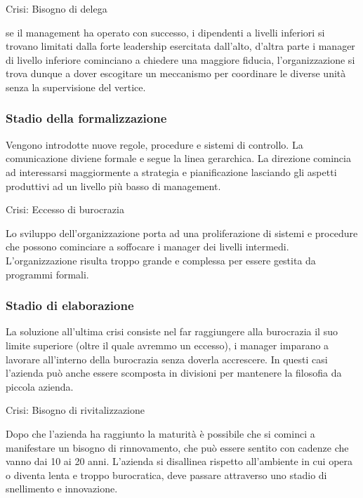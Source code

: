 \documentclass[14pt]{extarticle}
\begin{document}
\begin{center}
    \textcolor{red!50}{Crisi: Bisogno di delega}

    se il management ha operato con successo, i dipendenti a livelli inferiori
    si trovano limitati dalla forte leadership esercitata dall'alto, d'altra
    parte i manager di livello inferiore cominciano a chiedere una maggiore
    fiducia, l'organizzazione si trova dunque a dover escogitare un meccanismo
    per coordinare le diverse unità senza la supervisione del vertice.
\end{center}

\subsubsection{Stadio della formalizzazione}

Vengono introdotte nuove regole, procedure e sistemi di controllo. La
comunicazione diviene formale e segue la linea gerarchica. La direzione comincia
ad interessarsi maggiormente a strategia e pianificazione lasciando gli aspetti
produttivi ad un livello più basso di management.

\begin{center}
    \textcolor{red!50}{Crisi: Eccesso di burocrazia}

    Lo sviluppo dell'organizzazione porta ad una proliferazione di sistemi e
    procedure che possono cominciare a soffocare i manager dei livelli
    intermedi. L'organizzazione risulta troppo grande e complessa per essere
    gestita da programmi formali.
\end{center}

\subsubsection{Stadio di elaborazione}

La soluzione all'ultima crisi consiste nel far raggiungere alla burocrazia il
suo limite superiore (oltre il quale avremmo un eccesso), i manager imparano a
lavorare all'interno della burocrazia senza doverla accrescere. In questi casi
l'azienda può anche essere scomposta in divisioni per mantenere la filosofia da
piccola azienda.

\begin{center}
    \textcolor{red!50}{Crisi: Bisogno di rivitalizzazione}

    Dopo che l'azienda ha raggiunto la maturità è possibile che si cominci a
    manifestare un bisogno di rinnovamento, che può essere sentito con cadenze
    che vanno dai 10 ai 20 anni. L'azienda si disallinea rispetto all'ambiente
    in cui opera o diventa lenta e troppo burocratica, deve passare attraverso
    uno stadio di snellimento e innovazione.
\end{center}
\end{document}
